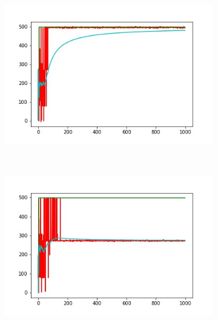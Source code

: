 \begin{figure} 
    \centering
    \begin{subfigure}[b]{0.39\textwidth}
        \includegraphics[width=\textwidth]{grafi1.jpg}
        \label{fig:gull}
    \end{subfigure}
    \vspace{0.5 mm}
    ~ %
    \begin{subfigure}[b]{0.39\textwidth}
        \includegraphics[width=\textwidth]{grafi2.jpg}
        \label{fig:tiger}
    \end{subfigure}
    ~ %
    \begin{subfigure}[b]{0.39\textwidth}

\end{subfigure}
\end{figure}
